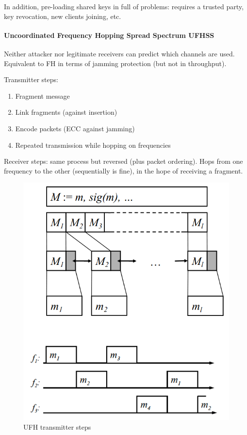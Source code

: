 In addition, pre-loading shared keys in full of problems:
requires a trusted party, key revocation, new clients joining, etc.

\paragraph{Uncoordinated Frequency Hopping Spread Spectrum UFHSS}
Neither attacker nor legitimate receivers can predict which channels are used.
Equivalent to FH in terms of jamming protection (but not in throughput).

Transmitter steps:
\begin{enumerate}
	\item Fragment message
	\item Link fragments (against insertion)
	\item Encode packets (ECC against jamming)
	\item Repeated transmission while hopping on frequencies
\end{enumerate}

Receiver steps: same process but reversed (plus packet ordering).
Hops from one frequency to the other (sequentially is fine), in the hope of receiving a fragment.

\begin{figure}
	\centering
	\includegraphics[scale=0.4]{images/3-ufh.png}
	\caption{UFH transmitter steps}
	\label{fig:ufh}
\end{figure}

